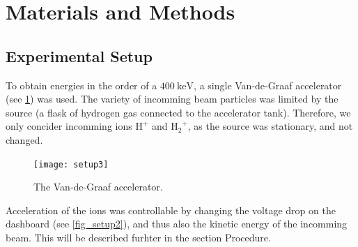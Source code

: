 \section{Materials and Methods}
\subsection{Experimental Setup}
To obtain energies in the order of a $\SI{400}{\kilo\electronvolt}$, a single Van-de-Graaf
accelerator (see \cref{fig_setup3}) was used. The variety of incomming beam particles
was limited by the source (a flask of hydrogen gas connected to the accelerator
tank). Therefore, we only concider incomming ions $\mathrm{H^+}$ and
$\mathrm{{H_{2}}^{+}}$, as the source was stationary, and not changed.
%
\begin{figure}[t]
    \centering
    \texttt{[image: setup3]}
    \caption{The Van-de-Graaf accelerator.}
    \label{fig_setup3}
\end{figure}
%
Acceleration of the ions was controllable by changing the voltage drop on the
dashboard (see \cref{fig_setup2}), and thus also the kinetic energy of the
incomming beam. This will be described furhter in the section Procedure.

